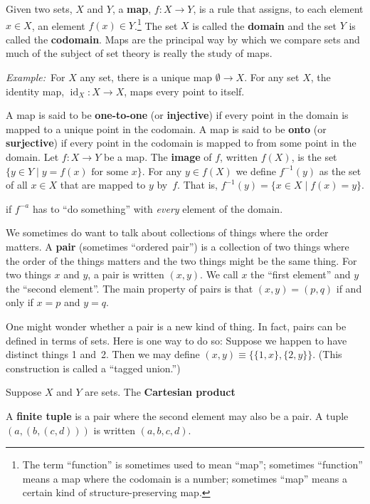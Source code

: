 \documentclass[10pt, a4paper, twocolumn]{article}
\newcommand{\defn}[1]{\textbf{#1}}
\newcommand{\eg}{\emph{Example:}\relax}
\begin{document}
Given two sets, $X$ and $Y$, a \defn{map}, $f : X \to Y$, is a rule that assigns,
to each element $x \in X$, an element $f(x) \in Y$.\footnote{The term “function” is
  sometimes used to mean “map”; sometimes “function” means a map where the
  codomain is a number; sometimes “map” means a certain kind of
  structure-preserving map.} The set $X$ is called the \defn{domain} and the set
$Y$ is called the \defn{codomain}. Maps are the principal way by which we
compare sets and much of the subject of set theory is really the study of maps.

\eg\ For $X$ any set, there is a unique map $\emptyset \to X$. For any set $X$, the identity
map, $\operatorname{id}_X : X \to X$, maps every point to itself.

A map is said to be \defn{one-to-one} (or \defn{injective}) if every point in
the domain is mapped to a unique point in the codomain. A map is said to be
\defn{onto} (or \defn{surjective}) if every point in the codomain is mapped to
from some point in the domain. Let $f:X \to Y$ be a map. The \defn{image} of $f$,
written $f(X)$, is the set $\{y \in Y \mid \text{$y = f(x)$ for some $x$}\}$. For any
$y \in f(X)$ we define $f^{-1}(y)$ as the set of all $x \in X$ that are mapped to
$y$ by~$f$. That is, $f^{-1}(y) = \{ x\in X\mid f(x) = y\}$.

if $f^{-a}$ has to “do something” with \emph{every} element of
the domain.


We sometimes do want to talk about collections of things where the order
matters. A \defn{pair} (sometimes “ordered pair”) is a collection of two things
where the order of the things matters and the two things might be the same
thing. For two things $x$ and $y$, a pair is written $(x, y)$. We call $x$ the
“first element” and $y$ the “second element”. The main property of pairs is that
$(x,y)=(p,q)$ if and only if $x=p$ and $y=q$.

One might wonder whether a pair is a new kind of thing. In fact, pairs can be
defined in terms of sets. Here is one way to do so: Suppose we happen to have
distinct things 1 and~2. Then we may define $(x, y) \equiv \{\{1, x\}, \{2,
y\}\}$. (This construction is called a “tagged union.”)

Suppose $X$ and $Y$ are sets. The \defn{Cartesian product} 


A \defn{finite tuple} is a pair where the second element may also be a pair. A
tuple $(a, (b, (c, d)))$ is written $(a, b, c, d)$. 
\end{document}
